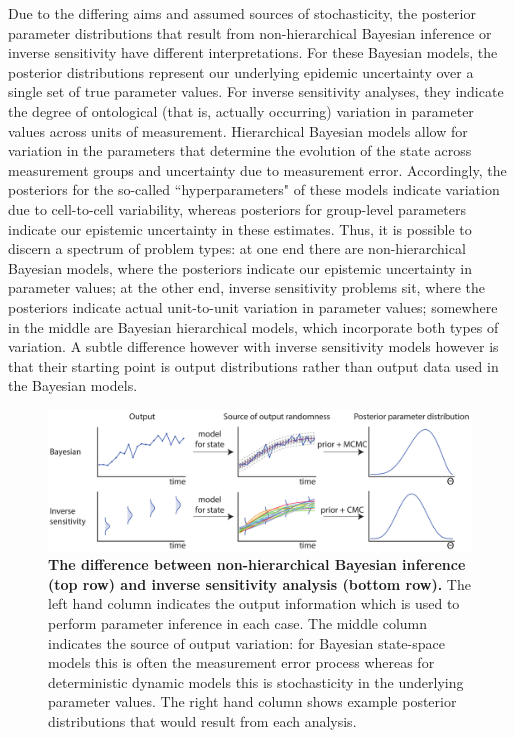 \documentclass[10pt,letterpaper]{article}
\begin{document}
Due to the differing aims and assumed sources of stochasticity, the posterior parameter distributions that result from non-hierarchical Bayesian inference or inverse sensitivity have different interpretations. For these Bayesian models, the posterior distributions represent our underlying epidemic uncertainty over a single set of true parameter values. For inverse sensitivity analyses, they indicate the degree of ontological (that is, actually occurring) variation in parameter values across units of measurement. Hierarchical Bayesian models allow for variation in the parameters that determine the evolution of the state across measurement groups and uncertainty due to measurement error. Accordingly, the posteriors for the so-called ``hyperparameters" of these models indicate variation due to cell-to-cell variability, whereas posteriors for group-level parameters indicate our epistemic uncertainty in these estimates. Thus, it is possible to discern a spectrum of problem types: at one end there are non-hierarchical Bayesian models, where the posteriors indicate our epistemic uncertainty in parameter values; at the other end, inverse sensitivity problems sit, where the posteriors indicate actual unit-to-unit variation in parameter values; somewhere in the middle are Bayesian hierarchical models, which incorporate both types of variation. A subtle difference however with inverse sensitivity models however is that their starting point is output distributions rather than output data used in the Bayesian models. 

\begin{figure}[H]
	\centerline{\includegraphics[width=1.25\textwidth]{../figures/comparing_bayes_sensitivity.pdf}}
	\caption{\textbf{The difference between non-hierarchical Bayesian inference (top row) and inverse sensitivity analysis (bottom row).} The left hand column indicates the output information which is used to perform parameter inference in each case. The middle column indicates the source of output variation: for Bayesian state-space models this is often the measurement error process whereas for deterministic dynamic models this is stochasticity in the underlying parameter values. The right hand column shows example posterior distributions that would result from each analysis.}
	\label{fig:difference_between_bayes_invsensitivity}
\end{figure}
\end{document}

